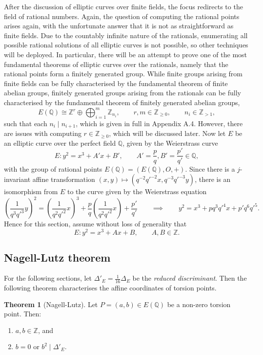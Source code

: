 \documentclass{article}
\newcommand{\Z}{\mathbb{Z}}
\newcommand{\Q}{\mathbb{Q}}
\newcommand{\rb}[1]{\left( #1 \right)}
\theoremstyle{definition}\newtheorem*{definition}{Definition}
\theoremstyle{definition}\newtheorem*{example}{Example}
\theoremstyle{definition}\newtheorem*{remark}{Remark}
\newtheorem{theorem}[proposition]{Theorem}
\begin{document}
After the discussion of elliptic curves over finite fields, the focus redirects to the field of rational numbers. Again, the question of computing the rational points arises again, with the unfortunate answer that it is not as straightforward as finite fields. Due to the countably infinite nature of the rationals, enumerating all possible rational solutions of all elliptic curves is not possible, so other techniques will be deployed. In particular, there will be an attempt to prove one of the most fundamental theorems of elliptic curves over the rationals, namely that the rational points form a finitely generated group. While finite groups arising from finite fields can be fully characterised by the fundamental theorem of finite abelian groups, finitely generated groups arising from the rationals can be fully characterised by the fundamental theorem of finitely generated abelian groups,
$$ E\rb{\Q} \cong \Z^r \oplus \bigoplus_{i = 1}^m \Z_{n_i}, \qquad r, m \in \Z_{\ge 0}, \qquad n_i \in \Z_{> 1}, $$
such that each $ n_i \mid n_{i + 1} $, which is given in full in Appendix A.4. However, there are issues with computing $ r \in \Z_{\ge 0} $, which will be discussed later. Now let $ E $ be an elliptic curve over the perfect field $ \Q $, given by the Weierstrass curve
$$ E : y^2 = x^3 + A'x + B', \qquad A' = \dfrac{p}{q}, B' = \dfrac{p'}{q'} \in \Q, $$
with the group of rational points $ E\rb{\Q} = \rb{E\rb{\Q}, O, +} $. Since there is a $ j $-invariant affine transformation $ \rb{x, y} \mapsto \rb{q^{-2}q'^{-2}x, q^{-3}q'^{-3}y} $, there is an isomorphism from $ E $ to the curve given by the Weierstrass equation
$$ \rb{\dfrac{1}{q^3q'^3}y}^2 = \rb{\dfrac{1}{q^2q'^2}x}^3 + \dfrac{p}{q}\rb{\dfrac{1}{q^2q'^2}x} + \dfrac{p'}{q'} \qquad \implies \qquad y^2 = x^3 + pq^3q'^4x + p'q^6q'^5. $$
Hence for this section, assume without loss of generality that
$$ E : y^2 = x^3 + Ax + B, \qquad A, B \in \Z. $$

\subsection{Nagell-Lutz theorem}

For the following sections, let $ \Delta'_E = \tfrac{1}{16}\Delta_E $ be the \emph{reduced discriminant}. Then the following theorem characterises the affine coordinates of torsion points.

\begin{theorem}[Nagell-Lutz]
\label{thm:nagelllutz}
Let $ P = \rb{a, b} \in E\rb{\Q} $ be a non-zero torsion point. Then:
\begin{enumerate}
\item $ a, b \in \Z $, and
\item $ b = 0 $ or $ b^2 \mid \Delta'_E $.
\end{enumerate}
\end{theorem}
\end{document}
